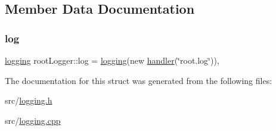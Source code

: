 \subsection{Member Data Documentation}
\mbox{\label{structroot_logger_a91e51e01c8b12e95891d79807b93a6f0}} 
\subsubsection{\texorpdfstring{log}{log}}
{\footnotesize\ttfamily \hyperlink{classlogging}{logging} root\+Logger\+::log = \hyperlink{classlogging}{logging}(new \hyperlink{classhandler}{handler}(\char`\"{}root.\+log\char`\"{}))\hspace{0.3cm}{\ttfamily [static]}, {\ttfamily [private]}}



The documentation for this struct was generated from the following files\+:\begin{DoxyCompactItemize}
\item 
src/\hyperlink{logging_8h}{logging.\+h}\item 
src/\hyperlink{logging_8cpp}{logging.\+cpp}\end{DoxyCompactItemize}
